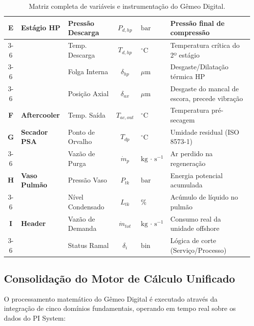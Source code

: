 \documentclass[12pt,a4paper]{article}
\numberwithin{equation}{section}
\numberwithin{table}{section}
\numberwithin{figure}{section}
\begin{document}
\begin{table}[h!tbp]
{\begin{tabular}{c l l c l l}
			\textbf{E} & \textbf{Estágio HP} & Pressão Descarga & $P_{d,hp}$ & $\text{bar}$ & Pressão final de compressão \\ \cline{3-6}
			& & Temp. Descarga & $T_{d,hp}$ & $^{\circ}\text{C}$ & Temperatura crítica do 2º estágio \\ \cline{3-6}
			& & Folga Interna & $\delta_{hp}$ & $\mu\text{m}$ & Desgaste/Dilatação térmica HP \\ \cline{3-6}
			& & Posição Axial & $\delta_{ax}$ & $\mu\text{m}$ & Desgaste do mancal de escora, precede vibração \\
			\textbf{F} & \textbf{Aftercooler} & Temp. Saída & $T_{ac,out}$ & $^{\circ}\text{C}$ & Temperatura pré-secagem \\
			\textbf{G} & \textbf{Secador PSA} & Ponto de Orvalho & $T_{dp}$ & $^{\circ}\text{C}$ & Umidade residual (ISO 8573-1) \\ \cline{3-6} 
			& & Vazão de Purga & $\dot{m}_{p}$ & $\text{kg}\,\cdotp\,\text{s}^{-1}$ & Ar perdido na regeneração \\
			\textbf{H} & \textbf{Vaso Pulmão} & Pressão Vaso & $P_{tk}$ & $\text{bar}$ & Energia potencial acumulada \\ \cline{3-6} 
			& & Nível Condensado & $L_{tk}$ & $\%$ & Acúmulo de líquido no pulmão \\
			\textbf{I} & \textbf{Header} & Vazão de Demanda & $\dot{m}_{tot}$ & $\text{kg}\,\cdotp\,\text{s}^{-1}$ & Consumo real da unidade offshore \\ \cline{3-6} 
			& & Status Ramal & $\delta_{i}$ & $\text{bin}$ & Lógica de corte (Serviço/Processo) \\ \bottomrule
		\end{tabular}
	}
	\caption[Matriz de variáveis e instrumentação do Gêmeo Digital]{Matriz completa de variáveis e instrumentação do Gêmeo Digital.}
	\label{tab:18-1}
\end{table}

\subsection{Consolidação do Motor de Cálculo Unificado}

O processamento matemático do Gêmeo Digital é executado através da integração de cinco domínios fundamentais, operando em tempo real sobre os dados do PI System:
\end{document}
